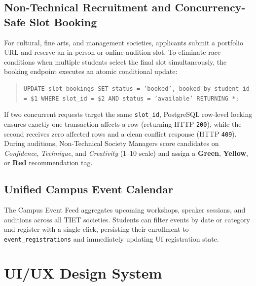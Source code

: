 \documentclass[12pt,a4paper]{report}
\begin{document}
\section{Non-Technical Recruitment and Concurrency-Safe Slot Booking}
For cultural, fine arts, and management societies, applicants submit a portfolio URL and reserve an in-person or online audition slot. To eliminate race conditions when multiple students select the final slot simultaneously, the booking endpoint executes an atomic conditional update:
\begin{quote}
\texttt{UPDATE slot\_bookings SET status = 'booked', booked\_by\_student\_id = \$1 WHERE slot\_id = \$2 AND status = 'available' RETURNING *;}
\end{quote}
If two concurrent requests target the same \texttt{slot\_id}, PostgreSQL row-level locking ensures exactly one transaction affects a row (returning HTTP \texttt{200}), while the second receives zero affected rows and a clean conflict response (HTTP \texttt{409}). During auditions, Non-Technical Society Managers score candidates on \textit{Confidence}, \textit{Technique}, and \textit{Creativity} (1--10 scale) and assign a \textbf{Green}, \textbf{Yellow}, or \textbf{Red} recommendation tag.

\section{Unified Campus Event Calendar}
The Campus Event Feed aggregates upcoming workshops, speaker sessions, and auditions across all TIET societies. Students can filter events by date or category and register with a single click, persisting their enrollment to \texttt{event\_registrations} and immediately updating UI registration state.

\chapter{UI/UX Design System}
\end{document}
